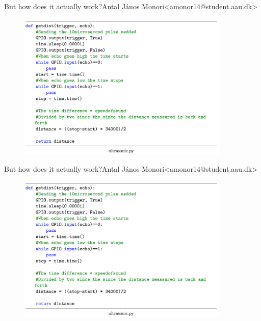 \begin{frame}{But how does it actually work?}{Antal János Monori\newline<amonor14@student.aau.dk>}
	\begin{figure}[h!]
		\includegraphics[width=0.9\textwidth]{images/dissensor.png}
	\end{figure}
\end{frame}

\begin{frame}{But how does it actually work?}{Antal János Monori\newline<amonor14@student.aau.dk>}
	\begin{figure}[h!]
		\includegraphics[width=0.9\textwidth]{images/dissensor.png}
	\end{figure}
\end{frame}

